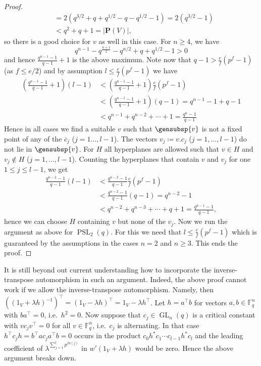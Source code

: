 \documentclass[a4paper,11pt]{amsproc}
\newcommand{\card}[1]{\left\lvert#1\right\rvert}%
\newcommand{\finfield}{\mathbb{F}}%
\DeclareMathOperator{\GL}{GL}%
\DeclareMathOperator{\PSL}{PSL}%
\newcommand{\proj}{\mathbf P}%
\theoremstyle{plain}
\theoremstyle{definition}
\begin{document}
\begin{proof}
\begin{align*}
			& =2(q^{3/2}+q+q^{1/2}-q-q^{1/2}-1)=2(q^{3/2}-1)\\
			& <q^2+q+1=\card{\proj(V)},
		\end{align*}
		so there is a good choice for $v$ as well in this case.
		For $n\geq4$, we have
		$$
		q^{n-1}-q^{\frac{n+1}{2}}-q^{n/2}+q+q^{1/2}-1>0
		$$
		and hence $\frac{q^{n-1}-1}{q-1}+1$ is the above maximum. Note now that $q-1>\frac{e}{f}(p^f-1)$ (as $f\leq e/2$) and by assumption $l\leq\frac{e}{f}(p^f-1)$ we have
		\begin{align*}
			\left(\frac{q^{n-1}-1}{q-1}+1\right)(l-1) 
			& <\left(\frac{q^{n-1}-1}{q-1}+1\right)\frac{e}{f}(p^f-1)\\
			& <\left(\frac{q^{n-1}-1}{q-1}+1\right)(q-1)=q^{n-1}-1+q-1\\
			& <q^{n-1}+q^{n-2}+\cdots+1=\frac{q^n-1}{q-1}
		\end{align*}
		Hence in all cases we find a suitable $v$ such that $\gensubsp{v}$ is not a fixed point of any of the $\overline{c}_j$ ($j=1\ldots,l-1$). The vectors $v_j\coloneqq v.c_j$ ($j=1,\ldots,l-1$) do not lie in $\gensubsp{v}$. For $H$ all hyperplanes are allowed such that $v\in H$ and $v_j\notin H$ ($j=1,\ldots,l-1$). Counting the hyperplanes that contain $v$ and $v_j$ for one $1\leq j\leq l-1$, we get
		\begin{align*}
			\frac{q^{n-2}-1}{q-1}(l-1) 
			& <\frac{q^{n-2}-1}{q-1}\frac{e}{f}(p^f-1)\\
			& <\frac{q^{n-2}-1}{q-1}(q-1)=q^{n-2}-1\\
			& <q^{n-2}+q^{n-3}+\cdots+q+1=\frac{q^{n-1}-1}{q-1},
		\end{align*}
		hence we can choose $H$ containing $v$ but none of the $v_j$. Now we run the argument as above for $\PSL_2(q)$. For this we need that $l\leq\frac{e}{f}(p^f-1)$ which is guaranteed by the assumptions in the cases $n=2$ and $n\geq 3$. This ends the proof.
	\end{proof}
	
	It is still beyond out current understanding how to incorporate the inverse-transpose automorphism in such an argument. Indeed, the above proof cannot work if we allow the inverse-transpose automorphism. Namely, then $((1_V+\lambda h)^{-1})^\top=(1_V-\lambda h)^\top=1_V-\lambda h^\top$. Let $h=a^\top b$ for vectors $a,b\in\finfield_q^n$ with $ba^\top=0$, i.e.\ $h^2=0$. Now suppose that $c_j\in\GL_n(q)$ is a critical constant with $v c_j v^\top=0$ for all $v\in\finfield_q^n$, i.e.\ $c_j$ is alternating. In that case $h^\top c_j h=b^\top ac_j a^\top b=0$ occurs in the product $c_0 h^\ast c_1\cdots c_{l-1} h^\ast c_l$ and the leading coefficient of $\lambda^{\sum_{j=1}^l{p^{fn(j)}}}$ in $w'(1_V+\lambda h)$ would be zero. Hence the above argument breaks down. 
	
\end{document}
